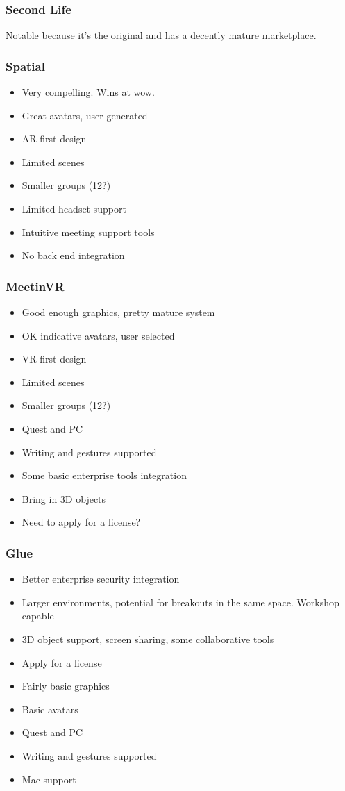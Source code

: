 \subsubsection{Second Life}
Notable because it's the original and has a decently mature marketplace.
\subsubsection{Spatial}
\begin{itemize}
\item Very compelling. Wins at wow.
\item Great avatars, user generated
\item AR first design
\item Limited scenes
\item Smaller groups (12?)
\item Limited headset support
\item Intuitive meeting support tools
\item No back end integration
\end{itemize}
\subsubsection{MeetinVR}
\begin{itemize}
\item Good enough graphics, pretty mature system
\item OK indicative avatars, user selected
\item VR first design
\item Limited scenes
\item Smaller groups (12?)
\item Quest and PC
\item Writing and gestures supported
\item Some basic enterprise tools integration
\item Bring in 3D objects
\item Need to apply for a license?
\end{itemize}
\subsubsection{Glue}
\begin{itemize}
\item Better enterprise security integration
\item Larger environments, potential for breakouts in the same space. Workshop capable
\item 3D object support, screen sharing, some collaborative tools
\item Apply for a license
\item Fairly basic graphics
\item Basic avatars
\item Quest and PC
\item Writing and gestures supported
\item Mac support
\end{itemize}

